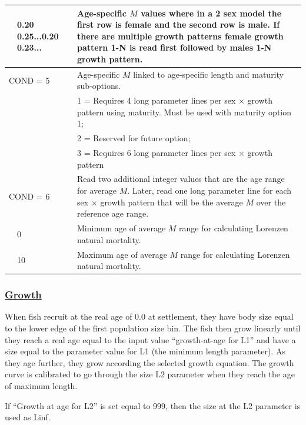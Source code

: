\begin{longtable}{p{0.5cm} p{2cm} p{12.75cm}}
	& 0.20 0.25...0.20 0.23... & Age-specific $M$ values where in a 2 sex model the first row is female and the second row is male. If there are multiple growth patterns female growth pattern 1-N is read first followed by males 1-N growth pattern. \Bstrut\\
	\hline
	
	\multicolumn{2}{l}{COND = 5} \Tstrut & Age-specific $M$ linked to age-specific length and maturity sub-options. \\

	&  & 1 = Requires 4 long parameter lines per sex $\times$ growth pattern using maturity. Must be used with maturity option 1; \\
	&  & 2 = Reserved for future option; \\
	&  & 3 = Requires 6 long parameter lines per sex $\times$ growth pattern \Bstrut\\
	\hline

	\multicolumn{2}{l}{COND = 6} \Tstrut & Read two additional integer values that are the age range for average $M$. Later, read one long parameter line for each sex $\times$ growth pattern that will be the average $M$ over the reference age range. \\
	& 0 \Tstrut & Minimum age of average $M$ range for calculating Lorenzen natural mortality. \\
	& 10 \Tstrut & Maximum age of average $M$ range for calculating Lorenzen natural mortality. \\ 
	\hline
\end{longtable}

\hypertarget{Growth}{}
\subsubsection[Growth]{\protect\hyperlink{Growth}{Growth}}

When fish recruit at the real age of 0.0 at settlement, they have body size equal to the lower edge of the first population size bin. The fish then grow linearly until they reach a real age equal to the input value ``growth-at-age for L1'' and have a size equal to the parameter value for L1 (the minimum length parameter). As they age further, they grow according the selected growth equation. The growth curve is calibrated to go through the size L2 parameter when they reach the age of maximum length.
	
If ``Growth at age for L2'' is set equal to 999, then the size at the L2 parameter is used as Linf. 
	

